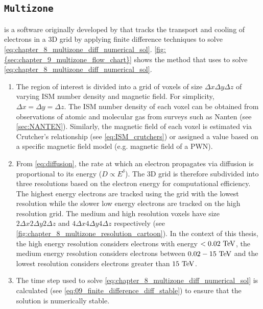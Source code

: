 \subsection{{\tt Multizone}} \label{sec:09_multizone_steps}

\multizone is a software originally developed by \cite{fabien} that tracks the transport and cooling of electrons in a 3D grid by applying finite difference techniques to solve \autoref{eq:chapter_8_multizone_diff_numerical_sol}. \autoref{fig:{sec:chapter_9_multizone_flow_chart}} shows the method that \multizone uses to solve \autoref{eq:chapter_8_multizone_diff_numerical_sol}.

\begin{enumerate}[label=\textbf{\arabic*}.]
\itemsep0em
\item The region of interest is divided into a grid of voxels of size $\Delta x\Delta y\Delta z$ of varying ISM number density and magnetic field. For simplicity, $\Delta x=\Delta y=\Delta z$. The ISM number density of each voxel can be obtained from observations of atomic and molecular gas from surveys such as Nanten (see \autoref{sec:NANTEN}). Similarly, the magnetic field of each voxel is estimated via Crutcher's relationship (see \autoref{eq:ISM_crutchers}) or assigned a value based on a specific magnetic field model (e.g. magnetic field of a PWN).
\item From \autoref{eq:diffusion}, the rate at which an electron propagates via diffusion is proportional to its energy ($D\propto E^\delta$). The 3D grid is therefore subdivided into three resolutions based on the electron energy for computational efficiency. The highest energy electrons are tracked using the grid with the lowest resolution while the slower low energy electrons are tracked on the high resolution grid. The medium and high resolution voxels have size $2\Delta x2\Delta y2\Delta z$ and $4\Delta x4\Delta y4\Delta z$ respectively (see \autoref{fig:chapter_8_multizone_resolution_cartoon}). In the context of this thesis, the high energy resolution considers electrons with energy $<0.02~\TeV$, the medium energy resolution considers electrons between $0.02-15~\TeV$ and the lowest resolution considers electrons greater than $15~\TeV$.
\item The time step used to solve \autoref{eq:chapter_8_multizone_diff_numerical_sol} is calculated (see \autoref{eq:09_finite_difference_diff_stable}) to ensure that the solution is numerically stable.
\setcounter{counter1}{\value{enumi}}
\end{enumerate}
